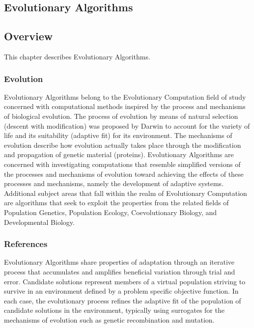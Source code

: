 

\renewcommand{\bibsection}{\subsection{\bibname}}
\begin{bibunit}

\chapter{Evolutionary Algorithms}
\label{ch:evolutionary}

\section{Overview}
This chapter describes Evolutionary Algorithms.

\subsection{Evolution}
Evolutionary Algorithms belong to the Evolutionary Computation field of study concerned with computational methods inspired by the process and mechanisms of biological evolution. The process of evolution by means of natural selection (descent with modification) was proposed by Darwin to account for the variety of life and its suitability (adaptive fit) for its environment. The mechanisms of evolution describe how evolution actually takes place through the modification and propagation of genetic material (proteins). Evolutionary Algorithms are concerned with investigating computations that resemble simplified versions of the processes and mechanisms of evolution toward achieving the effects of these processes and mechanisms, namely the development of adaptive systems.
Additional subject areas that fall within the realm of Evolutionary Computation are algorithms that seek to exploit the properties from the related fields of Population Genetics, Population Ecology, Coevolutionary Biology, and Developmental Biology. 

\subsection{References}
Evolutionary Algorithms share properties of adaptation through an iterative process that accumulates and amplifies beneficial variation through trial and error. Candidate solutions represent members of a virtual population striving to survive in an environment defined by a problem specific objective function. In each case, the evolutionary process refines the adaptive fit of the population of candidate solutions in the environment, typically using surrogates for the mechanisms of evolution such as genetic recombination and mutation.


\end{bibunit}
